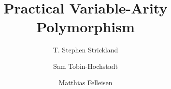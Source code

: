 \documentclass{llncs}
\begin{document}


\title{Practical Variable-Arity Polymorphism}

\author{T. Stephen Strickland \and Sam Tobin-Hochstadt \and
  Matthias Felleisen}

\maketitle










%








\end{document}
